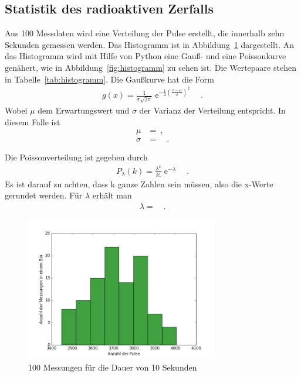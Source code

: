    
\clearpage


\subsection{Statistik des radioaktiven Zerfalls}
Aus 100 Messdaten wird eine Verteilung der Pulse erstellt, die innerhalb zehn Sekunden gemessen werden. Das Histogramm ist in Abbildung~\ref{fig:histogramm_unnormiert} dargestellt.
An das Histogramm wird mit Hilfe von Python eine Gauß- und eine Poissonkurve genähert, wie in Abbildung~\ref{fig:histogramm} zu sehen ist. Die Wertepaare stehen in Tabelle~\ref{tab:histogramm}.
Die Gaußkurve hat die Form
\begin{align}
	g(x) = \frac{1}{\sigma \sqrt{2\pi}}\operatorname{e}^{- \frac{1}{2} \left( \frac{x - \mu}{\sigma}   \right)^2} \quad .
\end{align}
Wobei $\mu$ dem Erwartungswert und $\sigma$ der Varianz der Verteilung entspricht. In diesem Falle ist
\begin{align}
	\mu &=   \ , \\
	\sigma &=   \quad .
\end{align}

Die Poissonverteilung ist gegeben durch
\begin{align}
	P_\lambda (k) = \frac{\lambda^k}{k!} \operatorname{e}^{- \lambda} \quad .
\end{align}
Es ist darauf zu achten, dass k ganze Zahlen sein müssen, also die x-Werte gerundet werden. Für $\lambda$ erhält man
\begin{align}
	\lambda =  \quad .
 \end{align}


  
     \begin{figure}[h!]
     	\centering
     	\includegraphics[width=0.75\textwidth]{build/histogramm_unnormiert.png}
     	\caption{100 Messungen für die Dauer von 10 Sekunden}
     	\label{fig:histogramm_unnormiert}
     \end{figure}
  
